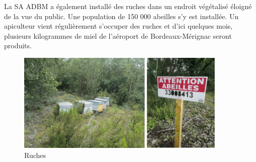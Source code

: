 La SA ADBM a également installé des ruches dans un endroit végétalisé éloigné de la vue du public. Une population de 150 000 abeilles s'y est installée. Un apiculteur vient régulièrement s'occuper des ruches et d'ici quelques mois, plusieurs kilogrammes de miel de l'aéroport de Bordeaux-Mérignac seront produits.

 \begin{figure}[hbt!]
   \centering
   \includegraphics[width=10cm]{Images/ruches.jpg}
   \caption{Ruches}
   \label{fig:abeilles}
 \end{figure}